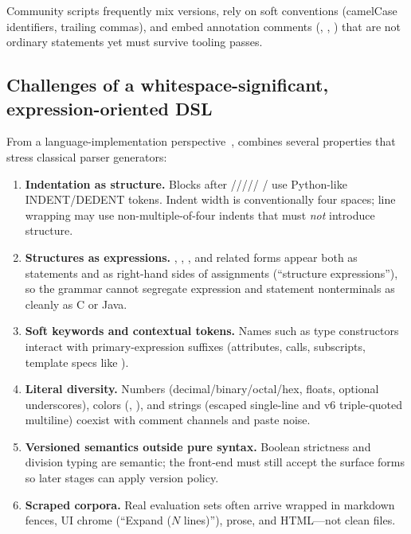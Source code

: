 \documentclass[11pt,a4paper]{article}
\begin{document}
Community scripts frequently mix versions, rely on soft conventions (camelCase
identifiers, trailing commas), and embed annotation comments
(, , ) that are not
ordinary statements yet must survive tooling passes.

\subsection{Challenges of a whitespace-significant, expression-oriented DSL}
\label{sec:challenges}

From a language-implementation perspective~\citep{aho2006dragon,cooper2012engineering,nystrom2021crafting},
\pine{} combines several properties that stress classical parser generators:

\begin{enumerate}[leftmargin=*]
  \item \textbf{Indentation as structure.}
    Blocks after /////
    /\code{=>} use Python-like INDENT/DEDENT tokens. Indent width is
    conventionally four spaces; line wrapping may use non-multiple-of-four
    indents that must \emph{not} introduce structure.
  \item \textbf{Structures as expressions.}
    , , , and related forms appear both as
    statements and as right-hand sides of assignments (``structure
    expressions''), so the grammar cannot segregate expression and statement
    nonterminals as cleanly as C or Java.
  \item \textbf{Soft keywords and contextual tokens.}
    Names such as type constructors interact with primary-expression suffixes
    (attributes, calls, subscripts, template specs like ).
  \item \textbf{Literal diversity.}
    Numbers (decimal/binary/octal/hex, floats, optional underscores), colors
    (, ), and strings (escaped single-line and
    v6 triple-quoted multiline) coexist with comment channels and paste noise.
  \item \textbf{Versioned semantics outside pure syntax.}
    Boolean strictness and division typing are semantic; the front-end must
    still accept the surface forms so later stages can apply version policy.
  \item \textbf{Scraped corpora.}
    Real evaluation sets often arrive wrapped in markdown fences, UI chrome
    (``Expand (\(N\) lines)''), prose, and HTML---not clean  files.
\end{enumerate}
\end{document}
